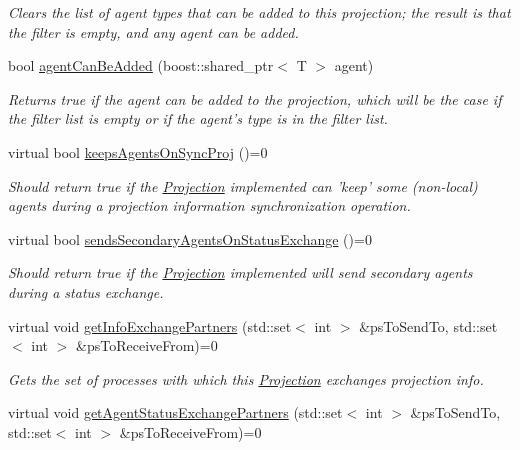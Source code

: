 \begin{DoxyCompactItemize}
\begin{DoxyCompactList}\small\item\em Clears the list of agent types that can be added to this projection; the result is that the filter is empty, and any agent can be added. \end{DoxyCompactList}\item 
bool \hyperlink{classrepast_1_1_projection_a4075a777a46f27e978d376c90e74a409}{agent\-Can\-Be\-Added} (boost\-::shared\-\_\-ptr$<$ T $>$ agent)
\begin{DoxyCompactList}\small\item\em Returns true if the agent can be added to the projection, which will be the case if the filter list is empty or if the agent's type is in the filter list. \end{DoxyCompactList}\item 
virtual bool \hyperlink{classrepast_1_1_projection_a1da1dcc47517e3e25be129067b21601f}{keeps\-Agents\-On\-Sync\-Proj} ()=0
\begin{DoxyCompactList}\small\item\em Should return true if the \hyperlink{classrepast_1_1_projection}{Projection} implemented can 'keep' some (non-\/local) agents during a projection information synchronization operation. \end{DoxyCompactList}\item 
virtual bool \hyperlink{classrepast_1_1_projection_a686c52a83dd917e50b04f81dc7321ad7}{sends\-Secondary\-Agents\-On\-Status\-Exchange} ()=0
\begin{DoxyCompactList}\small\item\em Should return true if the \hyperlink{classrepast_1_1_projection}{Projection} implemented will send secondary agents during a status exchange. \end{DoxyCompactList}\item 
virtual void \hyperlink{classrepast_1_1_projection_afdc13fccb129094bfd67b3446873933d}{get\-Info\-Exchange\-Partners} (std\-::set$<$ int $>$ \&ps\-To\-Send\-To, std\-::set$<$ int $>$ \&ps\-To\-Receive\-From)=0
\begin{DoxyCompactList}\small\item\em Gets the set of processes with which this \hyperlink{classrepast_1_1_projection}{Projection} exchanges projection info. \end{DoxyCompactList}\item 
virtual void \hyperlink{classrepast_1_1_projection_ad2d104bb6119d0911053d450932855d5}{get\-Agent\-Status\-Exchange\-Partners} (std\-::set$<$ int $>$ \&ps\-To\-Send\-To, std\-::set$<$ int $>$ \&ps\-To\-Receive\-From)=0

\end{DoxyCompactItemize}
